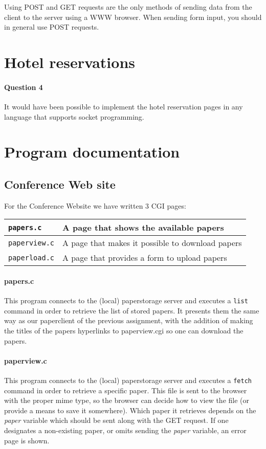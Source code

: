 \documentclass[a4paper,10pt]{article}
\begin{document}
Using \textsc{POST} and \textsc{GET} requests are the only methods of sending data
from the client to the server using a WWW browser. When sending form input, you
should in general use \textsc{POST} requests.

\section{Hotel reservations}
\paragraph{Question 4}
It would have been possible to implement the hotel reservation pages in any language
that supports socket programming.

\section{Program documentation}
\subsection{Conference Web site}
For the Conference Website we have written 3 CGI pages:
\begin{center}
\begin{tabular}{ l | p{9cm} }
\texttt{papers.c} & A page that shows the available papers\\ \hline
\texttt{paperview.c} & A page that makes it possible to download papers\\ \hline
\texttt{paperload.c} & A page that provides a form to upload papers\\
\end{tabular}
\end{center}

\paragraph{papers.c}
This program connects to the (local) paperstorage server and executes a \texttt{list}
command in order to retrieve the list of stored papers. It presents them the same way
as our paperclient of the previous assignment, with the addition of making the titles
of the papers hyperlinks to paperview.cgi so one can download the papers.

\paragraph{paperview.c}
This program connects to the (local) paperstorage server and executes a \texttt{fetch}
command in order to retrieve a specific paper. This file is sent to the browser with
the proper mime type, so the browser can decide how to view the file (or provide a
means to save it somewhere). Which paper it retrieves depends on the \textit{paper}
variable which should be sent along with the \textsc{GET} request. If one designates
a non-existing paper, or omits sending the \textit{paper} variable, an error page is
shown.
\end{document}
